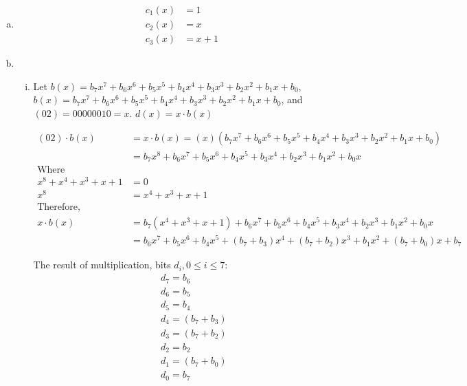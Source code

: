 \documentclass[11pt]{article}
\theoremstyle{definition}
\begin{document}
\begin{enumerate}[a. ]
  \item
    \begin{align*}
      c_1(x) &= 1 \\
      c_2(x) &= x \\
      c_3(x) &= x + 1
    \end{align*}

  \item
    \begin{enumerate}[i. ]
      \item
        Let $b(x) = b_7x^7 + b_6x^6 + b_5x^5 + b_4x^4 + b_3x^3 + b_2x^2 + b_1x + b_0$, $b(x) = b_7x^7 + b_6x^6 + b_5x^5 + b_4x^4 + b_3x^3 + b_2x^2 + b_1x + b_0$, and $(02) = 0000 0010 = x$. $d(x) = x \cdot b(x)$

        \begin{align*}
          (02) \cdot b(x) &= x \cdot b(x) = (x)(b_7x^7 + b_6x^6 + b_5x^5 + b_4x^4 + b_3x^3 + b_2x^2 + b_1x + b_0) \\
              &= b_7x^8 + b_6x^7 + b_5x^6 + b_4x^5 + b_3x^4 + b_2x^3 + b_1x^2 + b_0x \\
          \text{Where } \\
          x^8 + x^4 + x^3 + x + 1 &= 0 \\
          x^8 &= x^4 + x^3 + x + 1 \\
          \text{Therefore, } \\
          x \cdot b(x) &= b_7(x^4 + x^3 + x + 1) + b_6x^7 + b_5x^6 + b_4x^5 + b_3x^4 + b_2x^3 + b_1x^2 + b_0x \\
                       &= b_6x^7 + b_5x^6 + b_4x^5 + (b_7 + b_3)x^4 + (b_7 + b_2)x^3 + b_1x^2 + (b_7 + b_0)x + b_7
        \end{align*}

        The result of multiplication, bits $d_i, 0 \leq i \leq 7$:
        \begin{align*}
          &d_7 = b_6 \\
          &d_6 = b_5 \\
          &d_5 = b_4 \\
          &d_4 = (b_7 + b_3) \\
          &d_3 = (b_7 + b_2) \\
          &d_2 = b_2 \\
          &d_1 = (b_7 + b_0) \\
          &d_0 = b_7
        \end{align*}




\end{enumerate}
\end{enumerate}
\end{document}
